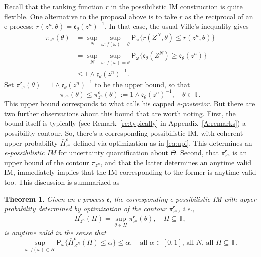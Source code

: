 \documentclass[a4paper, 12pt]{article}
\theoremstyle{plain}
\newtheorem{thm}{Theorem}
\theoremstyle{definition}
\theoremstyle{remark}
\newcommand{\prob}{\mathsf{P}}
\newcommand{\TT}{\mathbb{T}}
\newcommand{\uPi}{\overline{\Pi}}
\newcommand{\eval}{\mathfrak{e}}
\begin{document}
Recall that the ranking function $r$ in the possibilistic IM construction is quite flexible.  One alternative to the proposal above is to take $r$ as the reciprocal of an e-process: $r(z^n, \theta) = \eval_\theta(z^n)^{-1}$. In that case, the usual Ville's inequality gives 
\begin{align*}
\pi_{z^n}(\theta) & = \sup_N \sup_{\omega: f(\omega)=\theta} \prob_\omega\{ r(Z^N,\theta) \leq r(z^n,\theta)\} \\
& = \sup_N \sup_{\omega: f(\omega)=\theta} \prob_\omega\{ \eval_\theta(Z^N) \geq \eval_\theta(z^n) \} \\
& \leq 1 \wedge \eval_\theta(z^n)^{-1}.
\end{align*}
Set $\pi_{z^n}^\eval(\theta) = 1 \wedge \eval_\theta(z^n)^{-1}$ to be the upper bound, so that 
\[ \pi_{z^n}(\theta) \leq \pi_{z^n}^\eval(\theta) := 1 \wedge \eval_\theta(z^n)^{-1}, \quad \theta \in \TT. \]
This upper bound corresponds to what \citet{grunwald.epost} calls his capped {\em e-posterior}.  But there are two further observations about this bound that are worth noting.  First, the bound itself is typically (see Remark~\ref{re:typically} in Appendix~\ref{A:remarks}) a possibility contour.  So, there's a corresponding possibilistic IM, with coherent upper probability $\uPi_{z^n}^\eval$ defined via optimization as in \eqref{eq:upi}.  This determines an {\em e-possibilistic IM} for uncertainty quantification about $\Theta$.  Second, that $\pi_{z^n}^\eval$ is an upper bound of the contour $\pi_{z^n}$, and that the latter determines an anytime valid IM, immediately implies that the IM corresponding to the former is anytime valid too.  This discussion is summarized as

\begin{thm}
\label{thm:valid.vac}
Given an e-process $\eval$, the corresponding e-possibilistic IM with upper probability determined by optimization of the contour $\pi_{z^n}^\eval$, i.e.,  
\[ \uPi_{z^n}^\eval(H) = \sup_{\theta \in H} \pi_{z^n}^\eval(\theta), \quad H \subseteq \TT, \]
is anytime valid in the sense that 
\begin{equation}
\label{eq:valid.vac}
\sup_{\omega: f(\omega) \in H} \prob_\omega\{ \uPi_{Z^N}^\eval(H) \leq \alpha \} \leq \alpha, \quad \text{all $\alpha \in [0,1]$, all $N$, all $H \subseteq \TT$}. 
\end{equation}
\end{thm}
\end{document}
